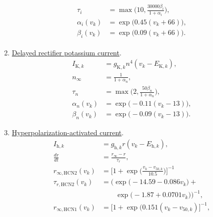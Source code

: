 \documentclass[../main.tex]{subfiles}
\begin{document}
\begin{enumerate}
\begin{equation}
\begin{aligned}
\begin{aligned}
            \tau_i &= \max\bigg(10, \displaystyle\frac{30000\beta_i}{1+\alpha_i} \bigg), \\
            \alpha_i(v_k) &= \exp{\big( 0.45(v_k+66)\big)},\\ %
            \beta_i(v_k) &= \exp{\big(0.09(v_k+66)\big)}.
            \label{eq:pyr-sodium-current}
        \end{aligned}
        \end{aligned}
        \end{equation}
    \item \underline{Delayed rectifier potassium current}.
        \begin{equation}
        \begin{aligned}
            I_{\text{K},k} &= g_{\text{K},k}n^4(v_k-E_{\text{K},k}), \\        
            n_\infty &= \displaystyle\frac{1}{1+\alpha_n}, \\ %
            \tau_n &= \max \Big(2, \displaystyle\frac{50\beta_n}{1+\alpha_n}\Big), \\
            \alpha_n(v_k) &= \exp{\big(-0.11(v_k-13)\big)}, \\%
            \beta_n(v_k)  &= \exp{\big(-0.09(v_k-13)\big)}.
            \label{eq:pyr-potassium-current}
        \end{aligned}
        \end{equation}
    \item \underline{Hyperpolarization-activated current}.
        \begin{equation}
        \begin{aligned}
            I_{\text{h},k} &= g_{\text{h},k}r(v_k-E_{\text{h},k}), \\
            \displaystyle\frac{dr}{dt} &= \displaystyle\frac{r_\infty-r}{\tau_r},\\
            r_{\infty,\text{HCN2}}(v_k) &= \Bigg[1+\exp{\Bigg( \displaystyle\frac{v_k-v_{50,k}}{10.5}\Bigg)} \Bigg]^{-1} \\
            \tau_{r,\text{HCN2}}(v_k) &= \Big( \exp{\big(-14.59-0.086v_k\big)} +\\ 
            \quad &\quad\quad\exp{\big(-1.87+0.0701v_k\big)}\Big)^{-1},  \\
            r_{\infty,\text{HCN1}}(v_k) &= \Bigg[1+\exp{( 0.151(v_k-v_{50,k})} \Bigg]^{-1}, \\

\end{aligned}
\end{equation}
\end{enumerate}
\end{document}
